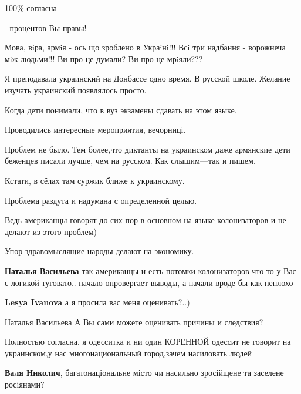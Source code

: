 \begin{itemize}
{\begin{itemize}
\end{itemize}

100\% согласна

💯 процентов Вы правы!


Мова, вiра, армiя - ось що зроблено в Украiнi!!! Всi три надбання - ворожнеча мiж
людьми!!! Ви про це думали? Ви про це мрiяли???


Я преподавала украинский на Донбассе одно время. В русской школе. Желание изучать
украинский появлялось просто.

Когда дети понимали, что в вуз экзамены сдавать на этом языке.

Проводились интересные мероприятия, вечорниці.

Проблем не было. Тем более,что диктанты на украинском даже армянские дети
беженцев писали лучше, чем на русском. Как слышим—так и пишем.

Кстати, в сёлах там суржик ближе к украинскому.

Проблема раздута и надумана с определенной целью.

Ведь американцы говорят до сих пор в основном на языке колонизаторов и не
делают из этого проблем)

Упор здравомыслящие народы делают на экономику.

\begin{itemize}

\textbf{Наталья Васильева} так американцы и есть потомки колонизаторов что-то у
Вас с логикой туговато.. начало опровергает выводы, а начали
вроде бы как неплохо

\textbf{Lesya Ivanova} а я просила вас меня оценивать?..)

Наталья Васильева А Вы сами можете оценивать причины и следствия?

\end{itemize}

Полностью согласна, я одесситка и ни один КОРЕННОЙ одессит не говорит на
украинском,у нас многонациональный город,зачем насиловать людей

\begin{itemize}

\textbf{Валя Николич}, багатонаціональне місто чи насильно зросійщене та заселене росіянами?


\end{itemize}}
\end{itemize}
